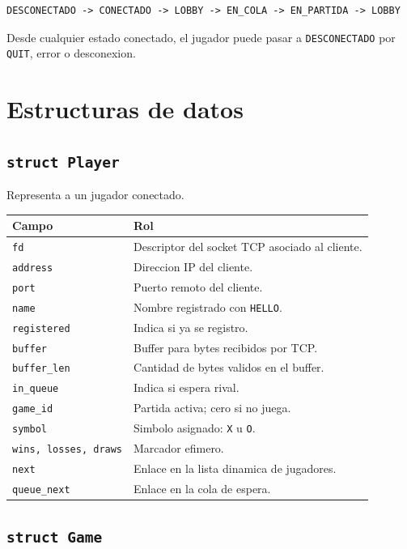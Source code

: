 \documentclass[12pt,a4paper]{article}
\begin{document}
\begin{lstlisting}[style=code]
DESCONECTADO -> CONECTADO -> LOBBY -> EN_COLA -> EN_PARTIDA -> LOBBY
\end{lstlisting}

Desde cualquier estado conectado, el jugador puede pasar a
\texttt{DESCONECTADO} por \texttt{QUIT}, error o desconexion.

\section{Estructuras de datos}

\subsection{\texttt{struct Player}}

Representa a un jugador conectado.

\begin{longtable}{|p{4cm}|p{9cm}|}
\hline
\textbf{Campo} & \textbf{Rol} \\
\hline
\texttt{fd} & Descriptor del socket TCP asociado al cliente. \\
\hline
\texttt{address} & Direccion IP del cliente. \\
\hline
\texttt{port} & Puerto remoto del cliente. \\
\hline
\texttt{name} & Nombre registrado con \texttt{HELLO}. \\
\hline
\texttt{registered} & Indica si ya se registro. \\
\hline
\texttt{buffer} & Buffer para bytes recibidos por TCP. \\
\hline
\texttt{buffer\_len} & Cantidad de bytes validos en el buffer. \\
\hline
\texttt{in\_queue} & Indica si espera rival. \\
\hline
\texttt{game\_id} & Partida activa; cero si no juega. \\
\hline
\texttt{symbol} & Simbolo asignado: \texttt{X} u \texttt{O}. \\
\hline
\texttt{wins, losses, draws} & Marcador efimero. \\
\hline
\texttt{next} & Enlace en la lista dinamica de jugadores. \\
\hline
\texttt{queue\_next} & Enlace en la cola de espera. \\
\hline
\end{longtable}

\subsection{\texttt{struct Game}}
\end{document}
